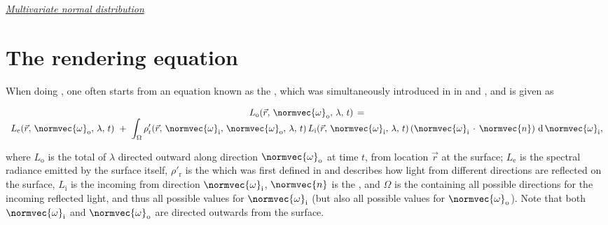 {\textit{\href{http://en.wikipedia.org/wiki/Multivariate\_normal\_distribution\#Non-degenerate\_case}{Multivariate normal distribution}}

\HRule





















\section{The rendering equation}

When doing , one often starts from an equation known as the , which was simultaneously introduced in  in \citep{temp} and \citep{temp}, and is given as

\begin{equation} \label{eq:rendering_equation_original}
\begin{array}{c}
L_{\text{o}}(\vec{r},\,\normvec{\omega}_{\text{o}},\, \lambda,\, t) \,= \\
\displaystyle L_{\text{e}}(\vec{r},\, \normvec{\omega}_{\text{o}},\, \lambda,\, t) \ + \ \int_\Omega \rho'_{\text{r}}(\vec{r},\, \normvec{\omega}_{\text{i}},\, \normvec{\omega}_{\text{o}},\, \lambda,\, t)\, L_{\text{i}}(\vec{r},\, \normvec{\omega}_{\text{i}},\, \lambda,\, t)\, (\normvec{\omega}_{\text{i}}\,\cdot\,\normvec{n})\, \operatorname d \normvec{\omega}_{\text{i}},
\end{array}
\end{equation}

where $L_{\text{o}}$ is the total  of  $\lambda$ directed outward along direction $\normvec{\omega}_{\text{o}}$ at time $t$, from location $\vec{r}$ at the surface; $L_{\text{e}}$ is the spectral radiance emitted by the surface itself, $\rho'_{\text{r}}$ is the \BRDF which was first defined in \citep{temp} and describes how light from different directions are reflected on the surface, $L_{\text{i}}$ is the  incoming from direction $\normvec{\omega}_{\text{i}}$, $\normvec{n}$ is the , and $\Omega$ is the  containing all possible directions for the incoming reflected light, and thus all possible values for $\normvec{\omega}_{\text{i}}$ (but also all possible values for $\normvec{\omega}_{\text{o}}$). Note that both $\normvec{\omega}_{\text{i}}$ and $\normvec{\omega}_{\text{o}}$ are directed outwards from the surface.

}
